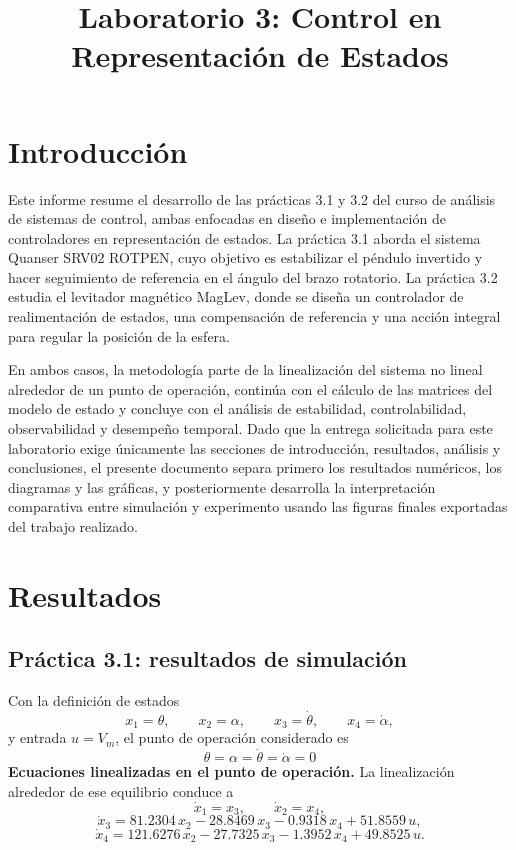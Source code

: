 \documentclass[conference]{IEEEtran}
\title{Laboratorio 3: Control en Representaci\'on de Estados}
\author{
\IEEEauthorblockN{Nombre Integrante 1, Nombre Integrante 2}
\IEEEauthorblockA{
Universidad de los Andes, Bogot\'a, Colombia\\
correo1@uniandes.edu.co, correo2@uniandes.edu.co}
}
\begin{document}
\maketitle

\section{Introducci\'on}
Este informe resume el desarrollo de las pr\'acticas 3.1 y 3.2 del curso de an\'alisis de sistemas de control, ambas enfocadas en dise\~no e implementaci\'on de controladores en representaci\'on de estados. La pr\'actica 3.1 aborda el sistema Quanser SRV02 ROTPEN, cuyo objetivo es estabilizar el p\'endulo invertido y hacer seguimiento de referencia en el \'angulo del brazo rotatorio. La pr\'actica 3.2 estudia el levitador magn\'etico MagLev, donde se dise\~na un controlador de realimentaci\'on de estados, una compensaci\'on de referencia y una acci\'on integral para regular la posici\'on de la esfera.

En ambos casos, la metodolog\'ia parte de la linealizaci\'on del sistema no lineal alrededor de un punto de operaci\'on, contin\'ua con el c\'alculo de las matrices del modelo de estado y concluye con el an\'alisis de estabilidad, controlabilidad, observabilidad y desempe\~no temporal. Dado que la entrega solicitada para este laboratorio exige \'unicamente las secciones de introducci\'on, resultados, an\'alisis y conclusiones, el presente documento separa primero los resultados num\'ericos, los diagramas y las gr\'aficas, y posteriormente desarrolla la interpretaci\'on comparativa entre simulaci\'on y experimento usando las figuras finales exportadas del trabajo realizado.

\section{Resultados}

\subsection{Pr\'actica 3.1: resultados de simulaci\'on}

Con la definici\'on de estados
\begin{equation}
x_1=\theta, \qquad x_2=\alpha, \qquad x_3=\dot{\theta}, \qquad x_4=\dot{\alpha},
\end{equation}
y entrada $u=V_m$, el punto de operaci\'on considerado es
\begin{equation}
\theta=\alpha=\dot{\theta}=\dot{\alpha}=0
\end{equation}
\noindent
\textbf{Ecuaciones linealizadas en el punto de operaci\'on.} La linealizaci\'on alrededor de ese equilibrio conduce a
\begin{equation}
\dot{x}_1=x_3, \qquad \dot{x}_2=x_4,
\end{equation}
\begin{equation}
\dot{x}_3=81.2304\,x_2-28.8469\,x_3-0.9318\,x_4+51.8559\,u,
\end{equation}
\begin{equation}
\dot{x}_4=121.6276\,x_2-27.7325\,x_3-1.3952\,x_4+49.8525\,u.
\end{equation}
\end{document}
